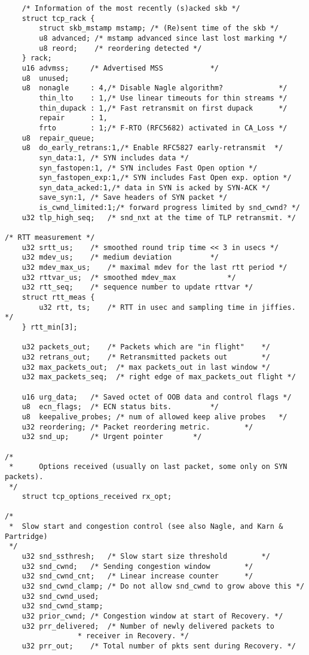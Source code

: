 \documentclass[11pt, a4paper,oneside]{book}
\theoremstyle{ocrenumbox}
\theoremstyle{purplenumbox}
\theoremstyle{blackbox}
\begin{document}
\begin{verbatim}
	/* Information of the most recently (s)acked skb */
	struct tcp_rack {
		struct skb_mstamp mstamp; /* (Re)sent time of the skb */
		u8 advanced; /* mstamp advanced since last lost marking */
		u8 reord;    /* reordering detected */
	} rack;
	u16	advmss;		/* Advertised MSS			*/
	u8	unused;
	u8	nonagle     : 4,/* Disable Nagle algorithm?             */
		thin_lto    : 1,/* Use linear timeouts for thin streams */
		thin_dupack : 1,/* Fast retransmit on first dupack      */
		repair      : 1,
		frto        : 1;/* F-RTO (RFC5682) activated in CA_Loss */
	u8	repair_queue;
	u8	do_early_retrans:1,/* Enable RFC5827 early-retransmit  */
		syn_data:1,	/* SYN includes data */
		syn_fastopen:1,	/* SYN includes Fast Open option */
		syn_fastopen_exp:1,/* SYN includes Fast Open exp. option */
		syn_data_acked:1,/* data in SYN is acked by SYN-ACK */
		save_syn:1,	/* Save headers of SYN packet */
		is_cwnd_limited:1;/* forward progress limited by snd_cwnd? */
	u32	tlp_high_seq;	/* snd_nxt at the time of TLP retransmit. */

/* RTT measurement */
	u32	srtt_us;	/* smoothed round trip time << 3 in usecs */
	u32	mdev_us;	/* medium deviation			*/
	u32	mdev_max_us;	/* maximal mdev for the last rtt period	*/
	u32	rttvar_us;	/* smoothed mdev_max			*/
	u32	rtt_seq;	/* sequence number to update rttvar	*/
	struct rtt_meas {
		u32 rtt, ts;	/* RTT in usec and sampling time in jiffies. */
	} rtt_min[3];

	u32	packets_out;	/* Packets which are "in flight"	*/
	u32	retrans_out;	/* Retransmitted packets out		*/
	u32	max_packets_out;  /* max packets_out in last window */
	u32	max_packets_seq;  /* right edge of max_packets_out flight */

	u16	urg_data;	/* Saved octet of OOB data and control flags */
	u8	ecn_flags;	/* ECN status bits.			*/
	u8	keepalive_probes; /* num of allowed keep alive probes	*/
	u32	reordering;	/* Packet reordering metric.		*/
	u32	snd_up;		/* Urgent pointer		*/

/*
 *      Options received (usually on last packet, some only on SYN packets).
 */
	struct tcp_options_received rx_opt;

/*
 *	Slow start and congestion control (see also Nagle, and Karn & Partridge)
 */
 	u32	snd_ssthresh;	/* Slow start size threshold		*/
 	u32	snd_cwnd;	/* Sending congestion window		*/
	u32	snd_cwnd_cnt;	/* Linear increase counter		*/
	u32	snd_cwnd_clamp; /* Do not allow snd_cwnd to grow above this */
	u32	snd_cwnd_used;
	u32	snd_cwnd_stamp;
	u32	prior_cwnd;	/* Congestion window at start of Recovery. */
	u32	prr_delivered;	/* Number of newly delivered packets to
				 * receiver in Recovery. */
	u32	prr_out;	/* Total number of pkts sent during Recovery. */


\end{verbatim}
\end{document}

